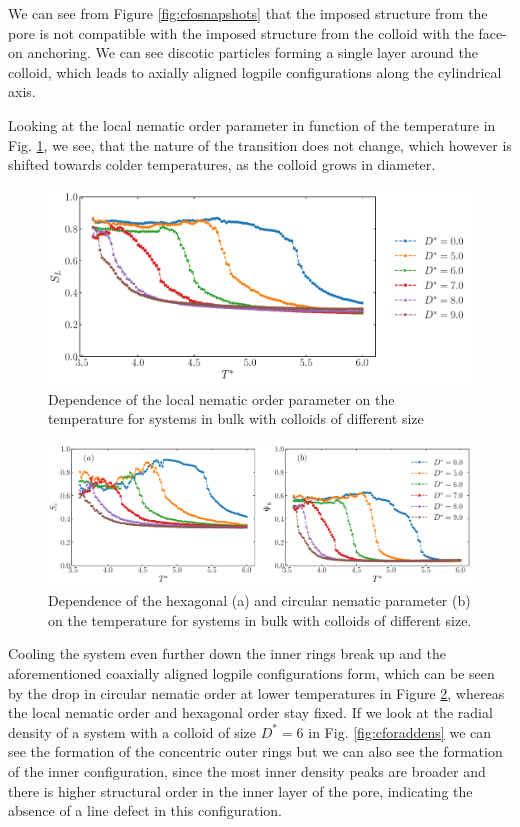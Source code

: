 We can see from Figure \ref{fig:cfosnapshots} that the imposed structure from the pore is not compatible with the imposed structure from the colloid with the face-on anchoring. We can see discotic particles forming a single layer around the colloid, which leads to axially aligned logpile configurations along the cylindrical axis.


Looking at the local nematic order parameter in function of the temperature in Fig. \ref{fig:cfonemloc}, we see, that the nature of the transition does not change, which however is shifted towards colder temperatures, as the colloid grows in diameter.


\begin{figure}[H]
    \centering
	\includegraphics[width=\linewidth]{plots/cfo_W8C56_nemloc.pdf}
	\caption{Dependence of the local nematic order parameter on the temperature for systems in bulk with colloids of different size}
    \label{fig:cfonemloc}
\end{figure}
\begin{figure}[H]
    \centering 
	\includegraphics[width=\linewidth]{plots/cfo_W8C56_hexcirc.pdf}
    \caption{Dependence of the hexagonal (a) and  circular nematic parameter (b)  on the temperature for systems in bulk with colloids of different size.}
    \label{fig:cfohexcirc}
\end{figure}


Cooling the system even further down the inner rings break up and the aforementioned coaxially aligned logpile configurations form, which can be seen by the drop in circular nematic order at lower temperatures in Figure \ref{fig:cfohexcirc}, whereas the local nematic order and hexagonal order stay fixed. If we look at the radial density of a system with a colloid of size $D^*=6$ in Fig. \ref{fig:cforaddens} we can see the formation of the concentric outer rings but we can also see the formation of the inner configuration, since the most inner density peaks are broader and there is higher structural order in the inner layer of the pore, indicating the absence of a line defect in this configuration.

